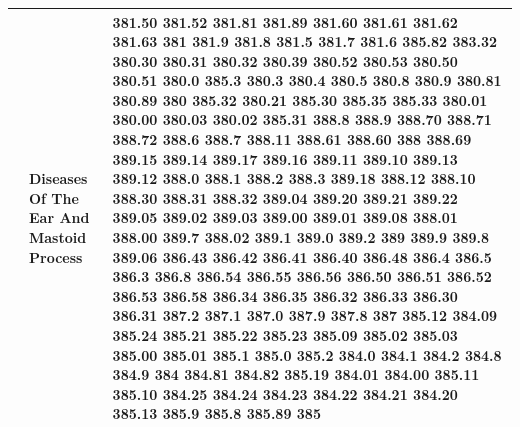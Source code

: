\documentclass[3p,super,numbers,sort&compress,preprint,10pt]{elsarticle}
\begin{document}
\begin{longtable}{|L{.1in}|L{.6in}||L{5.65in}|}
    & Diseases Of The Ear And Mastoid Process
  &  381.50 381.52 381.81 381.89 381.60 381.61 381.62 381.63 381 381.9 381.8 381.5 381.7 381.6 385.82 383.32 380.30 380.31 380.32 380.39 380.52 380.53 380.50 380.51 380.0 385.3 380.3 380.4 380.5 380.8 380.9 380.81 380.89 380 385.32 380.21 385.30 385.35 385.33 380.01 380.00 380.03 380.02 385.31 388.8 388.9 388.70 388.71 388.72 388.6 388.7 388.11 388.61 388.60 388 388.69 389.15 389.14 389.17 389.16 389.11 389.10 389.13 389.12 388.0 388.1 388.2 388.3 389.18 388.12 388.10 388.30 388.31 388.32 389.04 389.20 389.21 389.22 389.05 389.02 389.03 389.00 389.01 389.08 388.01 388.00 389.7 388.02 389.1 389.0 389.2 389 389.9 389.8 389.06 386.43 386.42 386.41 386.40 386.48 386.4 386.5 386.3 386.8 386.54 386.55 386.56 386.50 386.51 386.52 386.53 386.58 386.34 386.35 386.32 386.33 386.30 386.31 387.2 387.1 387.0 387.9 387.8 387 385.12 384.09 385.24 385.21 385.22 385.23 385.09 385.02 385.03 385.00 385.01 385.1 385.0 385.2 384.0 384.1 384.2 384.8 384.9 384 384.81 384.82 385.19 384.01 384.00 385.11 385.10 384.25 384.24 384.23 384.22 384.21 384.20 385.13 385.9 385.8 385.89 385
  \\\hline

\end{longtable}
\end{document}
